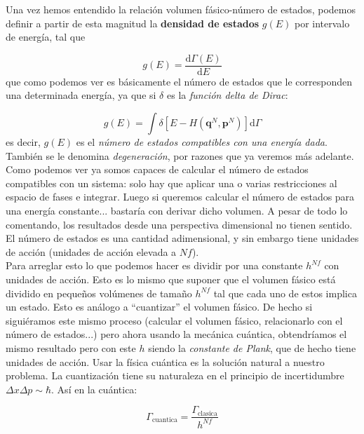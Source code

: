 \documentclass[12pt,a4paper]{article}
\numberwithin{equation}{section}
\numberwithin{figure}{section}
\newcommand{\parentesis}[1]{\left( #1  \right)}
\newcommand{\ccorchetes}[1]{\left[ #1  \right]}
\newcommand{\D}{\mathrm{d}}
\newcommand{\derivadas}[2]{\frac{\D #1}{\D #2}}
\newcommand{\pn}{\mathbf{p}}
\newcommand{\qn}{\mathbf{q}}
\theoremstyle{definition}
\begin{document}
Una vez hemos entendido la relación volumen fásico-número de estados, podemos definir a partir de esta magnitud la \textbf{densidad de estados} $g(E)$ por intervalo de energía, tal que

\begin{equation}
g(E) = \derivadas{\Gamma(E)}{E}
\end{equation}
que como podemos ver es básicamente el número de estados que le corresponden una determinada energía, ya que si $\delta$ es la \textit{función delta de Dirac}:

\begin{equation}
g(E) = \int \delta \ccorchetes{E-H\parentesis{\qn^N,\pn^N}} \D \Gamma
\end{equation}
es decir, $g(E)$ es el \textit{número de estados compatibles con una energía dada}. También se le denomina \textit{degeneración}, por razones que ya veremos más adelante. \\

Como podemos ver ya somos capaces de calcular el número de estados compatibles con un sistema: solo hay que aplicar una o varias restricciones al espacio de fases e integrar. Luego si queremos calcular el número de estados para una energía constante... bastaría con derivar dicho volumen. A pesar de todo lo comentando, los resultados desde una perspectiva dimensional no tienen sentido. El número de estados es una cantidad adimensional, y sin embargo tiene unidades de acción (unidades de acción elevada a $Nf$). \\

Para arreglar esto lo que podemos hacer es dividir por una constante $h^{Nf}$ con unidades de acción. Esto es lo mismo que suponer que el volumen fásico está dividido en pequeños volúmenes de tamaño $h^{Nf}$ tal que cada uno de estos implica un estado. Esto es análogo a ``cuantizar'' el volumen fásico. De hecho si siguiéramos este mismo proceso (calcular el volumen fásico, relacionarlo con el número de estados...) pero ahora usando la mecánica cuántica, obtendríamos el mismo resultado pero con este $h$ siendo la \textit{constante de Plank}, que de hecho tiene unidades de acción. Usar la física cuántica es la solución natural a nuestro problema. La cuantización tiene su naturaleza en el principio de incertidumbre  $\Delta x \Delta p \sim \hbar$. Así en la cuántica:

\begin{equation}
\Gamma_{\mathrm{cuantica}} = \dfrac{\Gamma_{\mathrm{clasica}}}{h^{Nf}}
\end{equation}
\end{document}
